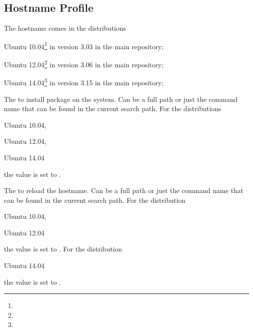 \subsection{Hostname Profile}

The hostname comes in the distributions 
\begin{compactitem}
\item[\TheDistribution{ubuntu}] Ubuntu 10.04\footnote{\TheUbuntuMaverickLTSDate} in version 3.03 in the main repository;
\item[\TheDistribution{ubuntu}] Ubuntu 12.04\footnote{\TheUbuntuPreciseLTSDate} in version 3.06 in the main repository;
\item[\TheDistribution{ubuntu}] Ubuntu 14.04\footnote{\TheUbuntuTrustyLTSDate} in version 3.15 in the main repository;
\end{compactitem}


The  to install package on the system. Can be a full path or
just the command name that can be found in the current search path. 
For the distributions 
\begin{inparaitem}
\item[\TheDistribution{ubuntu}] Ubuntu 10.04,
\item[\TheDistribution{ubuntu}] Ubuntu 12.04,
\item[\TheDistribution{ubuntu}] Ubuntu 14.04
\end{inparaitem}
the value is set to .


The  to reload the hostname. Can be a full path or
just the command name that can be found in the current search path.
For the distribution
\begin{inparaitem}
\item[\TheDistribution{ubuntu}] Ubuntu 10.04,
\item[\TheDistribution{ubuntu}] Ubuntu 12.04
\end{inparaitem}
the value is set to .
For the distribution
\begin{inparaitem}
\item[\TheDistribution{ubuntu}] Ubuntu 14.04
\end{inparaitem}
the value is set to .

